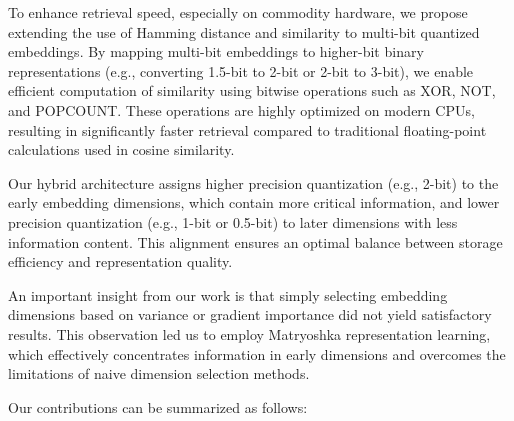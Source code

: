 To enhance retrieval speed, especially on commodity hardware, we propose extending the use of Hamming distance and similarity to multi-bit quantized embeddings. By mapping multi-bit embeddings to higher-bit binary representations (e.g., converting 1.5-bit to 2-bit or 2-bit to 3-bit), we enable efficient computation of similarity using bitwise operations such as XOR, NOT, and POPCOUNT. These operations are highly optimized on modern CPUs, resulting in significantly faster retrieval compared to traditional floating-point calculations used in cosine similarity.  
  
Our hybrid architecture assigns higher precision quantization (e.g., 2-bit) to the early embedding dimensions, which contain more critical information, and lower precision quantization (e.g., 1-bit or 0.5-bit) to later dimensions with less information content. This alignment ensures an optimal balance between storage efficiency and representation quality.  
  
An important insight from our work is that simply selecting embedding dimensions based on variance or gradient importance did not yield satisfactory results. This observation led us to employ Matryoshka representation learning, which effectively concentrates information in early dimensions and overcomes the limitations of naive dimension selection methods.  
  
Our contributions can be summarized as follows:  
  
